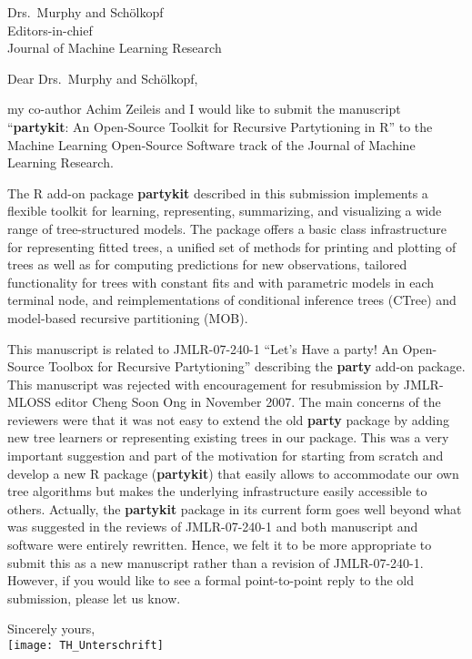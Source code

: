 \documentclass[ngerman,uzh]{scrlttr2}
\begin{document}

\begin{letter}{
Drs.~Murphy and Schölkopf \\
Editors-in-chief \\
Journal of Machine Learning Research}

\subject{JMLR-MLOSS submission}

\opening{Dear Drs.~Murphy and Schölkopf,}

my co-author Achim Zeileis and I would like to submit the manuscript
``\textbf{partykit}: An Open-Source Toolkit for Recursive Partytioning in R'' to the
Machine Learning Open-Source Software track of the Journal of Machine
Learning Research.

The \textsf{R} add-on package \textbf{partykit} described in this submission implements a
flexible toolkit for learning, representing, summarizing, and visualizing a
wide range of tree-structured models.  The package offers a basic class
infrastructure for representing fitted trees, a unified set of methods for
printing and plotting of trees as well as for computing predictions for new
observations, tailored functionality for trees with constant fits and with
parametric models in each terminal node, and reimplementations of conditional
inference trees (CTree) and model-based recursive partitioning (MOB).

This manuscript is related to JMLR-07-240-1 ``Let's Have a party! An
Open-Source Toolbox for Recursive Partytioning'' describing the
\textbf{party} add-on
package.  This manuscript was rejected with encouragement for resubmission by
JMLR-MLOSS editor Cheng Soon Ong in November 2007.  The main concerns of the
reviewers were that it was not easy to extend the old \textbf{party} package by adding
new tree learners or representing existing trees in our package.  This was
a very important suggestion and part of the motivation for starting from
scratch and develop a new R package (\textbf{partykit}) that easily allows to
accommodate our own tree algorithms but makes the underlying infrastructure
easily accessible to others. Actually, the \textbf{partykit} package in its current
form goes well beyond what was suggested in the reviews of JMLR-07-240-1
and both manuscript and software were entirely rewritten. Hence, we felt it
to be more appropriate to submit this as a new manuscript rather than a
revision of JMLR-07-240-1.  However, if you would like to see a formal
point-to-point reply to the old submission, please let us know.

Sincerely yours, \\
\texttt{[image: TH\_Unterschrift]}

\end{letter}
\end{document}
